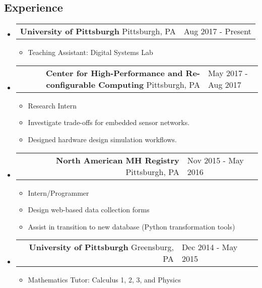 \documentclass[18pt]{article}
\makeatletter
\providecommand{\tightlist}{
    \setlength{\itemsep}{0pt}\setlength{\parskip}{0pt}
}
\providecommand{\datetable}[2]{
    \begin{tabular*}{\textwidth}{@{}r @{\extracolsep{\fill}} l}
        #1 & #2
    \end{tabular*}
}
\makeatother
\begin{document}
    \subsection*{Experience}\label{experience}
        \begin{itemize}[label={}]
        \item \datetable{
            \textbf{University of Pittsburgh} \textbar{} Pittsburgh, PA
        }{Aug 2017 - Present}
        \begin{itemize}[topsep=0pt]
            \item Teaching Assistant: Digital Systems Lab
        \end{itemize}
    
        \item \datetable{
            \textbf{Center for High-Performance and Re-configurable Computing} \textbar{} Pittsburgh, PA
        }{May 2017 - Aug 2017}
        \begin{itemize}[topsep=0pt]\tightlist
          \item Research Intern
          \item Investigate trade-offs for embedded sensor networks.
          \item Designed hardware design simulation workflows.
      	\end{itemize}
      
        \item \datetable{
            \textbf{North American MH Registry} 
            \textbar{} Pittsburgh, PA
        }{Nov 2015 - May 2016}
        \begin{itemize}[topsep=0pt]\tightlist
          \item Intern/Programmer
          \item Design web-based data collection forms
          \item Assist in transition to new database (Python transformation tools)
        \end{itemize}

        \item \datetable{
            \textbf{University of Pittsburgh} \textbar{} 
            Greensburg, PA
        }{Dec 2014 - May 2015}
        \begin{itemize}[topsep=0pt]
            \item Mathematics Tutor: Calculus 1, 2, 3, and Physics
        \end{itemize}
        \end{itemize}
      
\end{document}
